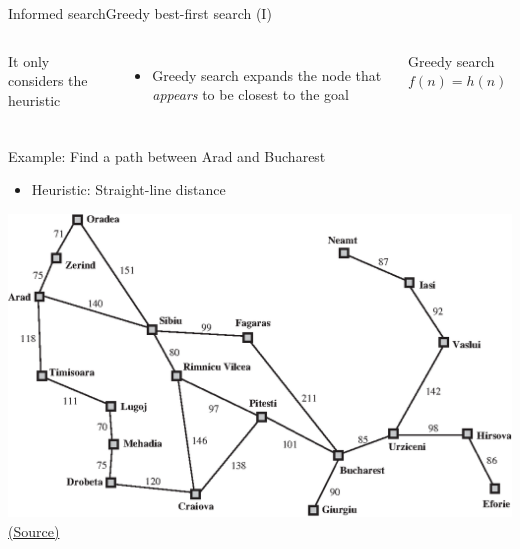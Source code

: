 \documentclass[10pt,compress]{beamer} %
\begin{document}
\begin{frame}{Informed search}{Greedy best-first search (I)}
    \begin{columns}
            It only considers the heuristic
            \begin{itemize}
                \item Greedy search expands the node that \textit{appears} to be closest to the goal
            \end{itemize}

            \begin{block}{Greedy search}
                $f(n) = h (n)$
            \end{block}
    \end{columns}
    
    \bigskip

    Example: Find a path between Arad and Bucharest
    \begin{itemize}
        \item Heuristic: Straight-line distance
    \end{itemize}

    \centering \includegraphics[width=0.6\linewidth]{figs/romania-distances.eps}\\
    \tiny{\href{http://aima.cs.berkeley.edu/index.html}{(Source)}}
\end{frame}
\end{document}
